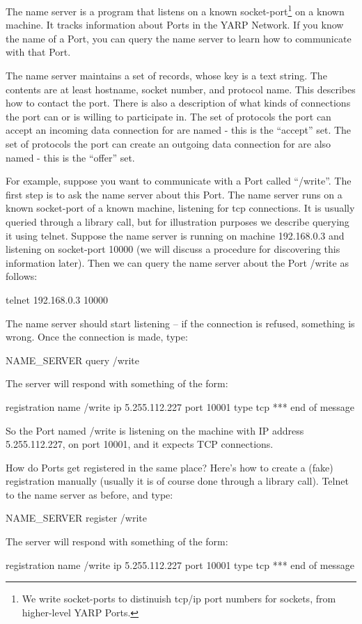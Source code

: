 \documentclass[a4]{article}
\begin{document}
\label{sect:name-protocol}

The name server is a program that listens on a known socket-port\footnote{We
write socket-ports to distinuish tcp/ip port numbers for sockets, 
from higher-level YARP Ports.}
on a known machine.
%
It tracks information about Ports in the YARP Network.
%
%
If you know the name
of a Port, you can query the name server to learn how to communicate
with that Port.

The name server maintains a set of records, whose key is a text
string.  The contents are at least hostname, socket number, and
protocol name.  This describes how to contact the port.  There is also
a description of what kinds of connections the port can or is willing
to participate in.  The set of protocols the port can accept an
incoming data connection for are named - this is the ``accept'' set.
The set of protocols the port can create an outgoing data connection
for are also named - this is the ``offer'' set.

For example, suppose you want to communicate with a Port called
``/write''.  The first step is to ask the name server about this
Port.  The name server runs on a known socket-port of a known machine,
listening for tcp connections.
It is usually queried through a library call, but for illustration
purposes we describe
querying it using telnet.  Suppose the name server is running on
machine 192.168.0.3 and listening on socket-port 10000 (we will
discuss a procedure for discovering this information later).
Then we can query the name server about the Port /write as follows:


\begin{code}
telnet 192.168.0.3 10000
\end{code}
%
The name server should start listening -- if the connection is refused,
something is wrong.  Once the connection is made, type:
%
\begin{code}
NAME_SERVER query /write
\end{code}
%
The server will respond with something of the form:
%
\begin{code}
registration name /write ip 5.255.112.227 port 10001 type tcp
*** end of message
\end{code}
%
So the Port named /write is listening on the machine with
IP address 5.255.112.227, on port 10001, and it expects TCP
connections.

How do Ports get registered in the same place?  Here's how to create a
(fake) registration
manually (usually it is of course done through a library call).
Telnet to the name server as before, and type:
%
\begin{code}
NAME_SERVER register /write
\end{code}
%
The server will respond with something of the form:
%
\begin{code}
registration name /write ip 5.255.112.227 port 10001 type tcp
*** end of message
\end{code}
\end{document}

